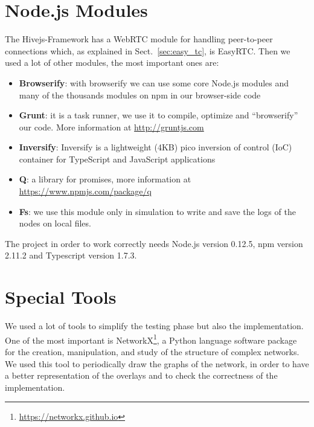 \section{Node.js Modules}
\label{sec:modules}
The Hivejs-Framework has a WebRTC module for handling peer-to-peer connections which, as explained in Sect.~\ref{sec:easy_tc}, is EasyRTC. Then we used a lot of other modules, the most important ones are:

\begin{itemize}
	\item \textbf{Browserify}: with browserify we can use some core Node.js modules and many of the thousands modules on npm in our browser-side code
	\item \textbf{Grunt}: it is a task runner, we use it to compile, optimize and ``browserify'' our code. More information at \url{http://gruntjs.com}
	\item \textbf{Inversify}: Inversify is a lightweight (4KB) pico inversion of control (IoC) container for TypeScript and JavaScript applications
	\item \textbf{Q}: a library for promises, more information at \url{https://www.npmjs.com/package/q}
	\item \textbf{Fs}: we use this module only in simulation to write and save the logs of the nodes on local files.
\end{itemize}

The project in order to work correctly needs Node.js version 0.12.5, npm version 2.11.2 and Typescript version 1.7.3.

\section{Special Tools}
We used a lot of tools to simplify the testing phase but also the implementation. One of the most important is NetworkX\footnote{\url{https://networkx.github.io}}, a Python language software package for the creation, manipulation, and study of the structure of complex networks. We used this tool to periodically draw the graphs of the network, in order to have a better representation of the overlays and to check the correctness of the implementation. 


